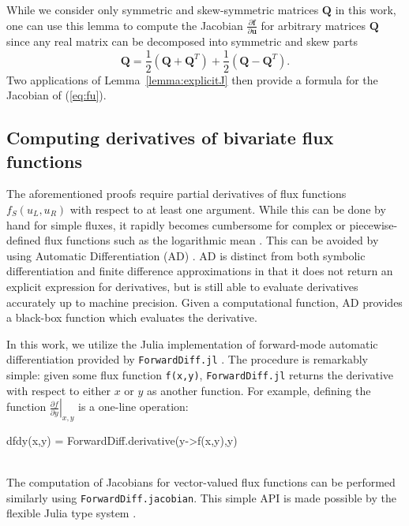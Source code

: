 \documentclass{article}
\newcommand{\pd}[2]{\frac{\partial#1}{\partial#2}}
\newcommand{\LRp}[1]{\left( #1 \right)}
\newcommand{\LRl}[1]{\left. #1 \right|}
\begin{document}
While we consider only symmetric and skew-symmetric matrices $\bm{Q}$ in this work, one can use this lemma to compute the Jacobian $\pd{\bm{f}}{\bm{u}}$ for arbitrary matrices $\bm{Q}$ since any real matrix can be decomposed into symmetric and skew parts
\[
\bm{Q} = \frac{1}{2} \LRp{\bm{Q}+\bm{Q}^T} +  \frac{1}{2} \LRp{\bm{Q}-\bm{Q}^T}.
\]
Two applications of Lemma~\ref{lemma:explicitJ} then provide a formula for the Jacobian of (\ref{eq:fu}).  

\subsection{Computing derivatives of bivariate flux functions}

The aforementioned proofs require partial derivatives of flux functions $f_S(u_L,u_R)$ with respect to at least one argument.  While this can be done by hand for simple fluxes, it rapidly becomes cumbersome for complex or piecewise-defined flux functions such as the logarithmic mean \cite{ismail2009affordable, winters2019entropy}.  This can be avoided by using Automatic Differentiation (AD) \cite{griewank2008evaluating}.  AD is distinct from both symbolic differentiation and finite difference approximations in that it does not return an explicit expression for derivatives, but is still able to evaluate derivatives accurately up to machine precision.  Given a computational function, AD provides a black-box function which evaluates the derivative.  

In this work, we utilize the Julia implementation of forward-mode automatic differentiation provided by \verb+ForwardDiff.jl+ \cite{RevelsLubinPapamarkou2016}.  The procedure is remarkably simple: given some flux function \verb+f(x,y)+, \verb+ForwardDiff.jl+ returns the derivative with respect to either $x$ or $y$ as another function.  For example, defining the function $\LRl{\pd{f}{y}}_{x,y}$ is a one-line operation:
\begin{verbbox}
dfdy(x,y) = ForwardDiff.derivative(y->f(x,y),y)
\end{verbbox}
\begin{figure}[!h]
\centering
\theverbbox
\end{figure}
\\
The computation of Jacobians for vector-valued flux functions can be performed similarly using \verb+ForwardDiff.jacobian+.  This simple API is made possible by the flexible Julia type system \cite{bezanson2017julia}.  
\end{document}
